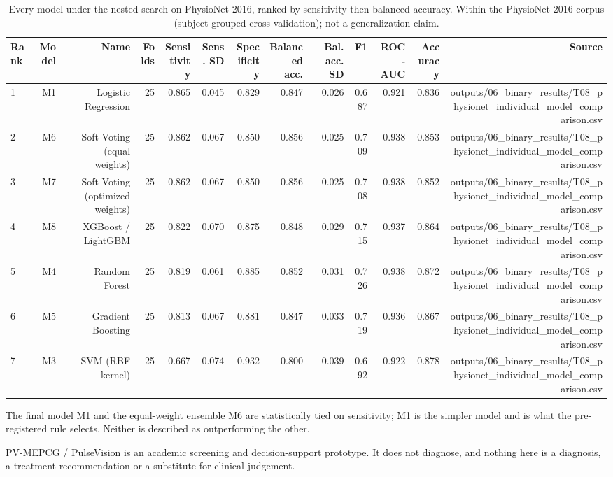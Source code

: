 \begin{table}[htbp]
  \centering
  \caption{Every model under the nested search on PhysioNet 2016, ranked by sensitivity then balanced accuracy. Within the PhysioNet 2016 corpus (subject-grouped cross-validation); not a generalization claim.}
  \label{tab:q1_t04}
  \begin{tabular}{lrrrrrrrrrrrr}
    \toprule
    Rank & Model & Name & Folds & Sensitivity & Sens. SD & Specificity & Balanced acc. & Bal. acc. SD & F1 & ROC-AUC & Accuracy & Source \\
    \midrule
    1 & M1 & Logistic Regression & 25 & 0.865 & 0.045 & 0.829 & 0.847 & 0.026 & 0.687 & 0.921 & 0.836 & outputs/06\_binary\_results/T08\_physionet\_individual\_model\_comparison.csv \\
    2 & M6 & Soft Voting (equal weights) & 25 & 0.862 & 0.067 & 0.850 & 0.856 & 0.025 & 0.709 & 0.938 & 0.853 & outputs/06\_binary\_results/T08\_physionet\_individual\_model\_comparison.csv \\
    3 & M7 & Soft Voting (optimized weights) & 25 & 0.862 & 0.067 & 0.850 & 0.856 & 0.025 & 0.708 & 0.938 & 0.852 & outputs/06\_binary\_results/T08\_physionet\_individual\_model\_comparison.csv \\
    4 & M8 & XGBoost / LightGBM & 25 & 0.822 & 0.070 & 0.875 & 0.848 & 0.029 & 0.715 & 0.937 & 0.864 & outputs/06\_binary\_results/T08\_physionet\_individual\_model\_comparison.csv \\
    5 & M4 & Random Forest & 25 & 0.819 & 0.061 & 0.885 & 0.852 & 0.031 & 0.726 & 0.938 & 0.872 & outputs/06\_binary\_results/T08\_physionet\_individual\_model\_comparison.csv \\
    6 & M5 & Gradient Boosting & 25 & 0.813 & 0.067 & 0.881 & 0.847 & 0.033 & 0.719 & 0.936 & 0.867 & outputs/06\_binary\_results/T08\_physionet\_individual\_model\_comparison.csv \\
    7 & M3 & SVM (RBF kernel) & 25 & 0.667 & 0.074 & 0.932 & 0.800 & 0.039 & 0.692 & 0.922 & 0.878 & outputs/06\_binary\_results/T08\_physionet\_individual\_model\_comparison.csv \\
    \bottomrule
  \end{tabular}
  \par\footnotesize The final model M1 and the equal-weight ensemble M6 are statistically tied on sensitivity; M1 is the simpler model and is what the pre-registered rule selects. Neither is described as outperforming the other.
  \par\footnotesize PV-MEPCG / PulseVision is an academic screening and decision-support prototype. It does not diagnose, and nothing here is a diagnosis, a treatment recommendation or a substitute for clinical judgement.
\end{table}
